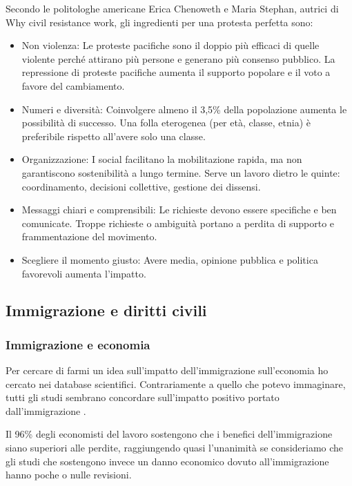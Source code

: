\documentclass[12pt]{book} %
\begin{document}
\begin{mdframed}[linewidth=1pt]
Secondo le politologhe americane Erica Chenoweth e Maria Stephan, autrici di Why civil resistance work, gli ingredienti per una protesta perfetta sono:
\begin{itemize}
\item Non violenza: Le proteste pacifiche sono il doppio più efficaci di quelle violente perché attirano più persone e generano più consenso pubblico. La repressione di proteste pacifiche aumenta il supporto popolare e il voto a favore del cambiamento.
\item Numeri e diversità: Coinvolgere almeno il 3,5\% della popolazione aumenta le possibilità di successo. Una folla eterogenea (per età, classe, etnia) è preferibile rispetto all'avere solo una classe.
\item Organizzazione: I social facilitano la mobilitazione rapida, ma non garantiscono sostenibilità a lungo termine. Serve un lavoro dietro le quinte: coordinamento, decisioni collettive, gestione dei dissensi.
\item Messaggi chiari e comprensibili: Le richieste devono essere specifiche e ben comunicate. Troppe richieste o ambiguità portano a perdita di supporto e frammentazione del movimento.
\item Scegliere il momento giusto: Avere media, opinione pubblica e politica favorevoli aumenta l’impatto.
\end{itemize}
\end{mdframed}

\subsection{Immigrazione e diritti civili}

\subsubsection{Immigrazione e economia}
Per cercare di farmi un idea sull'impatto dell'immigrazione sull'economia ho cercato nei database scientifici. Contrariamente a quello che potevo immaginare, tutti gli studi sembrano concordare sull'impatto positivo portato dall'immigrazione  .

Il 96\% degli economisti del lavoro sostengono che i benefici dell'immigrazione siano
superiori alle perdite, raggiungendo quasi
l'unanimità se consideriamo che gli studi che sostengono invece un danno economico dovuto
all'immigrazione hanno poche o nulle revisioni.
\end{document}
